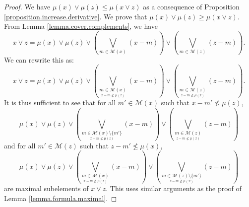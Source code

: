 \documentclass{article}
\begin{document}
\begin{proof}
    We have $\mu(x) \vee \mu(z) \le \mu(x\vee z)$ as a consequence of Proposition \ref{proposition.increase.derivative}.
    We prove that $\mu(x) \vee \mu(z) \ge \mu(x\vee z)$. From Lemma \ref{lemma.cover.complements}, we have 
    \[x \vee z = \mu(x)\vee \mu(z) \vee \left(\underset{{m \in \mathcal{M}(x)}}{\bigvee}(x-m)\right) \vee \left(\underset{{m \in \mathcal{M}(z)}}{\bigvee}(z-m)\right).\]
    We can rewrite this as: 
    \[x \vee z = \mu(x)\vee \mu(z) \vee \left(\underset{\underset{x-m \not \le \mu(z)}{m \in \mathcal{M}(x)}}{\bigvee}(x-m)\right) \vee \left(\underset{\underset{z-m \not \le \mu(x)}{m \in \mathcal{M}(z)}}{\bigvee}(z-m)\right).\]
    It is thus sufficient to see that for all $m' \in \mathcal{M}(x)$ such that $x-m' \not \le \mu(z)$, 
    \[\mu(x)\vee \mu(z) \vee \left(\underset{\underset{x-m \not \le \mu(z)}{m \in \mathcal{M}(x) \setminus \{m'\}}}{\bigvee}(x-m)\right) \vee \left(\underset{\underset{z-m \not \le \mu(x)}{m \in \mathcal{M}(z)}}{\bigvee}(z-m)\right)\]
    and for all $m' \in \mathcal{M}(z)$ such that $z-m' \not \le \mu(x)$, 
    \[\mu(x)\vee \mu(z) \vee \left(\underset{\underset{x-m \not \le \mu(z)}{m \in \mathcal{M}(x)}}{\bigvee}(x-m)\right) \vee \left(\underset{\underset{z-m \not \le \mu(x)}{m \in \mathcal{M}(z)\setminus \{m'\}}}{\bigvee}(z-m)\right)\]
    are maximal subelements of $x \vee z$. This uses similar arguments as the proof of Lemma \ref{lemma.formula.maximal}.
\end{proof}
\end{document}
